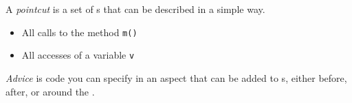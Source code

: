 \begin{definition}[Pointcut]\label{def:Pointcut}
  A \emph{pointcut} is a set of s that can be described in a simple way.
  \begin{itemize}[noitemsep]
  \item All calls to the method \texttt{m()}
  \item All accesses of a variable \texttt{v}
  \end{itemize}
\end{definition}

\begin{definition}[Advice]\label{def:Advice}
  \emph{Advice} is code you can specify in an aspect that can be added to s, either before, after, or around the .
\end{definition}
